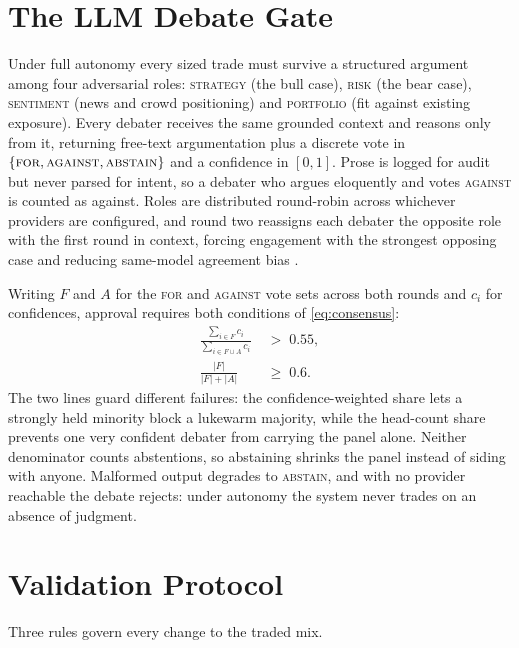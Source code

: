 \documentclass[conference]{IEEEtran}
\begin{document}
\section{The LLM Debate Gate}
\label{sec:debate}

Under full autonomy every sized trade must survive a structured argument among
four adversarial roles: \textsc{strategy} (the bull case), \textsc{risk} (the
bear case), \textsc{sentiment} (news and crowd positioning) and
\textsc{portfolio} (fit against existing exposure). Every debater receives the
same grounded context and reasons only from it, returning free-text
argumentation plus a discrete vote in
$\{\textsc{for},\textsc{against},\textsc{abstain}\}$ and a confidence in
$[0,1]$. Prose is logged for audit but never parsed for intent, so a debater
who argues eloquently and votes \textsc{against} is counted as against. Roles
are distributed round-robin across whichever providers are configured, and
round two reassigns each debater the opposite role with the first round in
context, forcing engagement with the strongest opposing case and reducing
same-model agreement bias \cite{du2023improving}.

Writing $F$ and $A$ for the \textsc{for} and \textsc{against} vote sets across
both rounds and $c_i$ for confidences, approval requires both conditions of
\eqref{eq:consensus}:
\begin{equation}
\label{eq:consensus}
\begin{aligned}
\frac{\sum_{i \in F} c_i}{\sum_{i \in F \cup A} c_i} \;&>\; 0.55,\\[2pt]
\frac{|F|}{|F| + |A|} \;&\geq\; 0.6.
\end{aligned}
\end{equation}
The two lines guard different failures: the confidence-weighted share lets a
strongly held minority block a lukewarm majority, while the head-count share
prevents one very confident debater from carrying the panel alone. Neither
denominator counts abstentions, so abstaining shrinks the panel instead of
siding with anyone. Malformed output degrades to \textsc{abstain}, and with no
provider reachable the debate rejects: under autonomy the system never trades
on an absence of judgment.

\section{Validation Protocol}
\label{sec:method}

Three rules govern every change to the traded mix.
\end{document}
